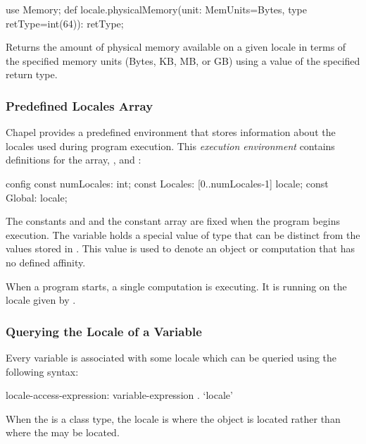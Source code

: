 \begin{protohead}
use Memory;
def locale.physicalMemory(unit: MemUnits=Bytes, type retType=int(64)): retType;
\end{protohead}
\begin{protobody}
Returns the amount of physical memory available on a given locale in
terms of the specified memory units (Bytes, KB, MB, or GB) using a
value of the specified return type.
\end{protobody}

\subsubsection{Predefined Locales Array}
\label{Predefined_Locales_Array}

Chapel provides a predefined environment  
that stores information about the locales used during program
execution.  This {\em execution environment} contains 
definitions for the  array, , and :
\begin{chapel}
config const numLocales: int;
const Locales: [0..numLocales-1] locale;
const Global: locale;
\end{chapel}
The constants  and  and the constant
 array are fixed when the program begins execution.  
The variable  holds a special value of  type 
that can be distinct from the values stored in .  This value is 
used to denote an object or computation that has no defined affinity.

When a program starts, a single computation is executing.  It is
running on the locale given by .

\subsubsection{Querying the Locale of a Variable}
\label{Querying_the_Locale_of_a_Variable}

Every variable  is associated with some locale which can be
queried using the following syntax:
\begin{syntax}
locale-access-expression:
  variable-expression . `locale'
\end{syntax}
When the  is a class type, the locale is where the
object is located rather than where the  may be
located.

